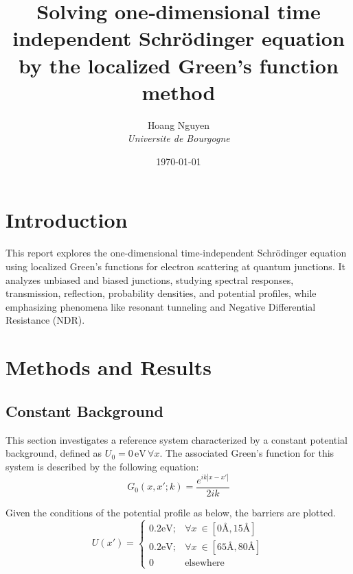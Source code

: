 \documentclass[twocolumn]{article}[ht]
\title{Solving one‐dimensional time independent Schrödinger equation by the localized Green’s function method}
\author{Hoang Nguyen \\ \textit{Universite de Bourgogne}}
\date{\today}
\begin{document}
\maketitle

\section{Introduction}
This report explores the one-dimensional time-independent Schrödinger equation using localized Green's functions for electron scattering at quantum junctions. It analyzes unbiased and biased junctions, studying spectral responses, transmission, reflection, probability densities, and potential profiles, while emphasizing phenomena like resonant tunneling and Negative Differential Resistance (NDR).
\section{Methods and Results}
\subsection{Constant Background}

This section investigates a reference system characterized by a constant potential background, defined as \(U_0 = 0 \, \text{eV} \, \forall x\). The associated Green's function for this system is described by the following equation:
\begin{equation}
    G_0(x, x'; k) = \frac{e^{ik |x - x'|}}{2ik}
\end{equation}

Given the conditions of the potential profile as below, the barriers are plotted.
\begin{equation}
    U(x') =
    \begin{cases}
        0.2 \text{eV}; & \forall x\ \in [0 \text{\AA}, 15 \text{\AA}] \\
        0.2 \text{eV}; & \forall x\ \in [65 \text{\AA}, 80 \text{\AA}] \\
        0 & \text{elsewhere}
    \end{cases}
\end{equation}
\end{document}
